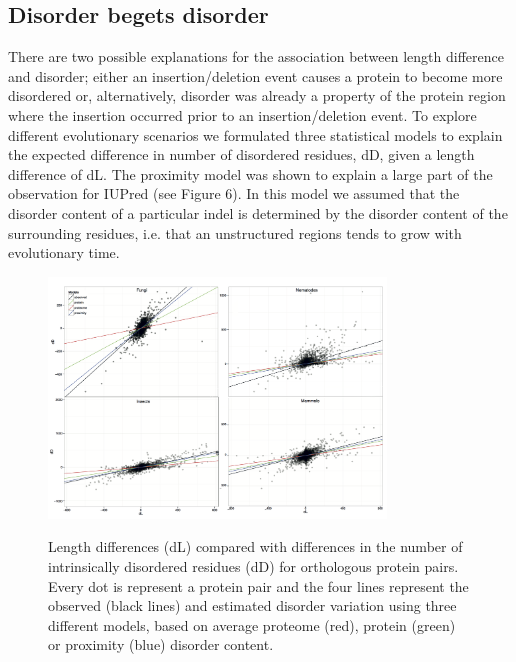 \documentclass[11pt, a4paper,oneside]{report}
\begin{document}
\subsection{Disorder begets disorder}
There are two possible explanations for the association between length difference and disorder; either an insertion/deletion event causes a protein to become more disordered or, alternatively, disorder was already a property of the protein region where the insertion occurred prior to an insertion/deletion event. To explore different evolutionary scenarios we formulated three statistical models to explain the expected difference in number of disordered residues, dD, given a length difference of dL. The proximity model was shown to explain a large part of the observation for IUPred (see Figure 6). In this model we assumed that the disorder content of a particular indel is determined by the disorder content of the surrounding residues, i.e. that an unstructured regions tends to grow with evolutionary time. 
\begin{figure}[t]
\begin{center}
\label{img:populations}
\includegraphics[width=0.8\textwidth]{figures/lenvar.png}
\end{center}
\caption{Length differences (dL) compared with differences in the
  number of intrinsically disordered residues (dD) for orthologous
  protein pairs. Every dot is represent a protein pair and the four
  lines represent the observed (black lines) and estimated disorder
  variation using three different models, based on average proteome
  (red), protein (green) or proximity (blue) disorder content.} 
\end{figure}
\end{document}
